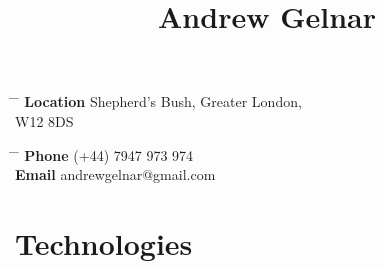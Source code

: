 \documentclass[10pt]{article} %
\begin{document}

\title{Andrew Gelnar} %


\parbox{0.5\textwidth}{ %
\begin{tabbing} %
\hspace{3cm} \= \hspace{4cm} \= \kill %
{\bf Location} \> Shepherd's Bush, Greater London, \\ %
\> W12 8DS \\ %
\end{tabbing}}
\hfill %
\parbox{0.5\textwidth}{ %
\begin{tabbing} %
\hspace{3cm} \= \hspace{4cm} \= \kill %
{\bf Phone} \> (+44) 7947 973 974 \\ %
{\bf Email} \> andrewgelnar@gmail.com \\ %
\end{tabbing}}





\vspace{-1cm}
\section{Technologies}
\end{document}
